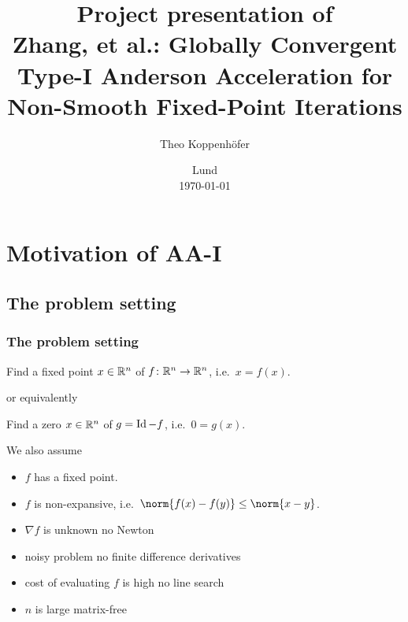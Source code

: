 %




\subject{, VT23}
\title{Project presentation of \\[1ex]
{\large Zhang, et al.: Globally Convergent Type-I Anderson Acceleration for Non-Smooth Fixed-Point Iterations}}
\author{Theo Koppenhöfer}
\date{Lund \\[1ex] \today}











\frame[plain]{\titlepage}



\section{Motivation of AA-I}
\subsection{The problem setting}
\begin{frame}
	\frametitle{The problem setting}
	\begin{problem}
		Find a fixed point $x\in\mathbb{R}^n$ of $f\colon\mathbb{R}^n\to\mathbb{R}^n$, i.e.\ $x=f(x)$.
	\end{problem}
	or equivalently
	\begin{problem}
		Find a zero $x\in\mathbb{R}^n$ of $g=\operatorname{Id}-f$, i.e.\ $0=g(x)$.
	\end{problem}
	We also assume
	\begin{itemize}
		\item $f$ has a fixed point.
		\item $f$ is non-expansive, i.e.\ $\norm{f(x)-f(y)}\leq\norm{x-y}$.
		\item $\nabla f$ is unknown \textrightarrow no Newton
		\item noisy problem \textrightarrow no finite difference derivatives
		\item cost of evaluating $f$ is high \textrightarrow no line search
		\item $n$ is large \textrightarrow matrix-free
	\end{itemize}
\end{frame}

